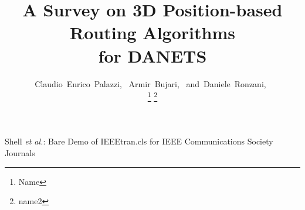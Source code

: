 \documentclass[journal,comsoc]{IEEEtran}
\begin{document}
%
\title{A Survey on 3D Position-based Routing Algorithms\\for DANETS }
%
%
%

\author{Claudio~Enrico~Palazzi,~
        Armir~Bujari,~\IEEEmembership{}
        and~Daniele~Ronzani,~\IEEEmembership{}%

\thanks{Name} \thanks{name2}%
}

% 
%



%
{Shell \MakeLowercase{\textit{et al.}}: Bare Demo of IEEEtran.cls for IEEE Communications Society Journals}
% 
\end{document}
